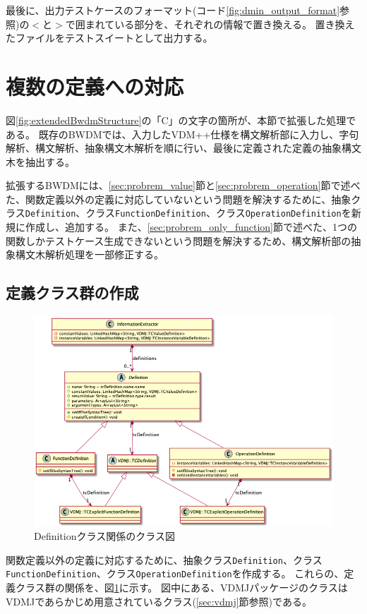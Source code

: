 \documentclass[uplatex, report, a4j, 10pt]{jsbook}
\newcommand\ttt[1]{\texttt{#1}}
\begin{document}
最後に、出力テストケースのフォーマット(コード\ref{fig:dmin_output_format}参照)の$<$と$>$で囲まれている部分を、それぞれの情報で置き換える。
置き換えたファイルをテストスイートとして出力する。

\section{複数の定義への対応}\label{sec:extendMultiple}
図\ref{fig:extendedBwdmStructure}の「C」の文字の箇所が、本節で拡張した処理である。
既存のBWDMでは、入力したVDM++仕様を構文解析部に入力し、字句解析、構文解析、抽象構文木解析を順に行い、最後に定義された定義の抽象構文木を抽出する。

拡張するBWDMには、\ref{sec:probrem_value}節と\ref{sec:probrem_operation}節で述べた、関数定義以外の定義に対応していないという問題を解決するために、抽象クラス\ttt{Definition}、クラス\ttt{FunctionDefinition}、クラス\ttt{OperationDefinition}を新規に作成し、追加する。
また、\ref{sec:probrem_only_function}節で述べた、1つの関数しかテストケース生成できないという問題を解決するため、構文解析部の抽象構文木解析処理を一部修正する。

\subsection{定義クラス群の作成}\label{sec:create_definition}
\begin{figure}[tp]
  \centering
  \includegraphics[keepaspectratio, width=160mm]{figs/Definition_class_diagram}
  \caption{Definitionクラス関係のクラス図}
  \label{fig:definition_class}
\end{figure}

関数定義以外の定義に対応するために、抽象クラス\ttt{Definition}、クラス\ttt{FunctionDefinition}、クラス\ttt{OperationDefinition}を作成する。
これらの、定義クラス群の関係を、図\ref{fig:definition_class}に示す。
図中にある、VDMJパッケージのクラスはVDMJであらかじめ用意されているクラス(\ref{sec:vdmj}節参照)である。
\end{document}
